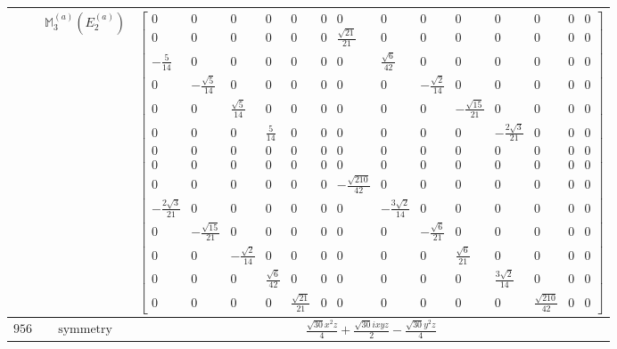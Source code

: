 \documentclass[fleqn,8pt,landscape]{jsarticle}
\begin{document}
\begin{longtable}{ccc}
$  $ & $ \mathbb{M}_{3}^{(a)}(E_{2}^{(a)}) $ & $ \begin{bmatrix} 0 & 0 & 0 & 0 & 0 & 0 & 0 & 0 & 0 & 0 & 0 & 0 & 0 & 0 \\ 0 & 0 & 0 & 0 & 0 & 0 & \frac{\sqrt{21}}{21} & 0 & 0 & 0 & 0 & 0 & 0 & 0 \\ - \frac{5}{14} & 0 & 0 & 0 & 0 & 0 & 0 & \frac{\sqrt{6}}{42} & 0 & 0 & 0 & 0 & 0 & 0 \\ 0 & - \frac{\sqrt{5}}{14} & 0 & 0 & 0 & 0 & 0 & 0 & - \frac{\sqrt{2}}{14} & 0 & 0 & 0 & 0 & 0 \\ 0 & 0 & \frac{\sqrt{5}}{14} & 0 & 0 & 0 & 0 & 0 & 0 & - \frac{\sqrt{15}}{21} & 0 & 0 & 0 & 0 \\ 0 & 0 & 0 & \frac{5}{14} & 0 & 0 & 0 & 0 & 0 & 0 & - \frac{2 \sqrt{3}}{21} & 0 & 0 & 0 \\ 0 & 0 & 0 & 0 & 0 & 0 & 0 & 0 & 0 & 0 & 0 & 0 & 0 & 0 \\ 0 & 0 & 0 & 0 & 0 & 0 & 0 & 0 & 0 & 0 & 0 & 0 & 0 & 0 \\ 0 & 0 & 0 & 0 & 0 & 0 & - \frac{\sqrt{210}}{42} & 0 & 0 & 0 & 0 & 0 & 0 & 0 \\ - \frac{2 \sqrt{3}}{21} & 0 & 0 & 0 & 0 & 0 & 0 & - \frac{3 \sqrt{2}}{14} & 0 & 0 & 0 & 0 & 0 & 0 \\ 0 & - \frac{\sqrt{15}}{21} & 0 & 0 & 0 & 0 & 0 & 0 & - \frac{\sqrt{6}}{21} & 0 & 0 & 0 & 0 & 0 \\ 0 & 0 & - \frac{\sqrt{2}}{14} & 0 & 0 & 0 & 0 & 0 & 0 & \frac{\sqrt{6}}{21} & 0 & 0 & 0 & 0 \\ 0 & 0 & 0 & \frac{\sqrt{6}}{42} & 0 & 0 & 0 & 0 & 0 & 0 & \frac{3 \sqrt{2}}{14} & 0 & 0 & 0 \\ 0 & 0 & 0 & 0 & \frac{\sqrt{21}}{21} & 0 & 0 & 0 & 0 & 0 & 0 & \frac{\sqrt{210}}{42} & 0 & 0 \end{bmatrix} $ \\ \hline
$ 956 $ & $ \text{symmetry} $ & $ \frac{\sqrt{30} x^{2} z}{4} + \frac{\sqrt{30} i x y z}{2} - \frac{\sqrt{30} y^{2} z}{4} $ \\

\end{longtable}
\end{document}
